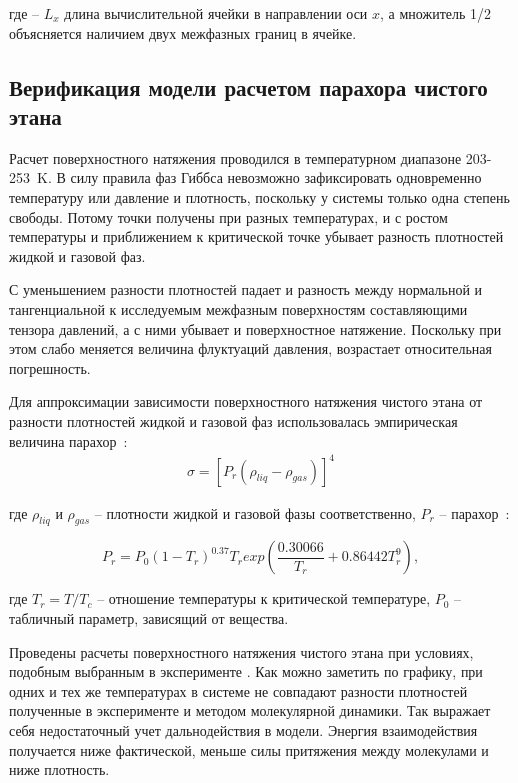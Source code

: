 где \--- $L_x$ длина вычислительной ячейки в направлении оси $x$, а множитель 1/2 объясняется наличием двух межфазных границ в ячейке.

\subsection{Верификация модели расчетом парахора чистого этана}\label{subsec:ch3/sect2/sub2}

Расчет поверхностного натяжения проводился в температурном диапазоне 203-253~K. В силу правила фаз Гиббса невозможно зафиксировать одновременно температуру или давление и плотность, поскольку у системы только одна степень свободы. Потому точки получены при разных температурах, и с ростом температуры и приближением к критической точке убывает разность плотностей жидкой и газовой фаз.

С уменьшением разности плотностей падает и разность между нормальной и тангенциальной к исследуемым межфазным поверхностям составляющими тензора давлений, а с ними убывает и поверхностное натяжение. Поскольку при этом слабо меняется величина флуктуаций давления, возрастает относительная погрешность. 

Для аппроксимации зависимости поверхностного натяжения чистого этана от разности плотностей жидкой и газовой фаз использовалась эмпирическая величина парахор~\cite{_-_1996}:
\begin{equation}
    \label{eq:parachor_definition}
    \begin{alignedat}{2}
	\sigma = [P_r (\rho_{liq} - \rho_{gas})]^4
	\end{alignedat}
\end{equation}

где $\rho_{liq}$ и $\rho_{gas}$ \--- плотности жидкой и газовой фазы соответственно, $P_r$ \--- парахор~\cite{escobedo}:

$$ P_r = P_0 (1-T_r)^{0.37} T_r exp(\frac{0.30066}{T_r}+0.86442T_r^9), $$

где $ T_r=T/T_c $ \--- отношение температуры к критической температуре, $P_0$ \--- табличный параметр, зависящий от вещества.

Проведены расчеты поверхностного натяжения чистого этана при условиях, подобным выбранным в эксперименте \cite{baidakov}. Как можно заметить по графику, при одних и тех же температурах в системе не совпадают разности плотностей полученные в эксперименте и методом молекулярной динамики. Так выражает себя недостаточный учет дальнодействия в модели. Энергия взаимодействия получается ниже фактической, меньше силы притяжения между молекулами и ниже плотность. 

